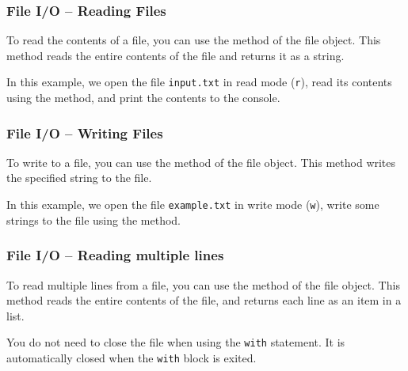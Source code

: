 \documentclass{beamer}
\begin{document}
\begin{frame} \frametitle{File I/O -- Reading Files} To read the contents of a file, you can use the \texttt{} method of the file object. This method reads the entire contents of the file and returns it as a string.

  
  
  In this example, we open the file \texttt{input.txt} in read mode (\texttt{r}), read its contents using the \texttt{}  method, and print the contents to the console. \end{frame}
  
  \begin{frame} \frametitle{File I/O -- Writing Files} To write to a file, you can use the \texttt{} method of the file object. This method writes the specified string to the file.
  
  
  
  In this example, we open the file \texttt{example.txt} in write mode (\texttt{w}), write some strings to the file using the \texttt{} method. 
\end{frame}
\begin{frame}
  \frametitle{File I/O -- Reading multiple lines}
  To read multiple lines from a file, you can use the \texttt{} method of the file object. This method reads the entire contents of the file, and returns each line as an item in a list.
  
  You do not need to close the file when using the \texttt{with} statement. It is automatically closed when the \texttt{with} block is exited.
\end{frame}
\end{document}
